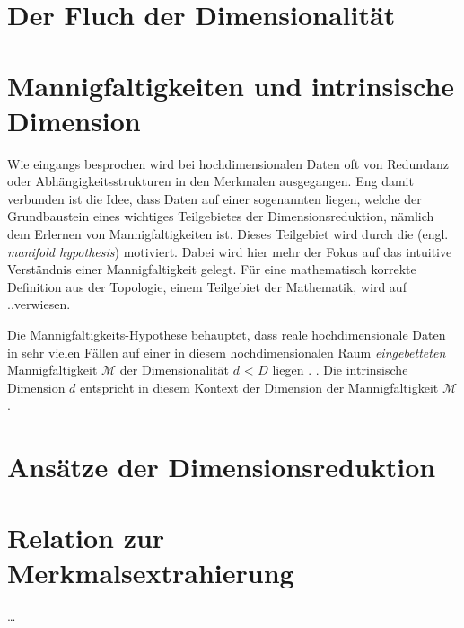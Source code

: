 \section{Der Fluch der Dimensionalität}
\label{ch:Dimensionsreduktion:FluchDerDim}

\section{Mannigfaltigkeiten und intrinsische Dimension}
\label{ch:Dimensionsreduktion:MannigfaltigkeitenIntrinsDim}

Wie eingangs besprochen wird bei hochdimensionalen Daten oft von Redundanz oder
Abhängigkeitsstrukturen in den Merkmalen ausgegangen. Eng damit verbunden ist die Idee, dass Daten
auf einer sogenannten  liegen, welche der Grundbaustein eines wichtiges
Teilgebietes der Dimensionsreduktion, nämlich dem Erlernen von Mannigfaltigkeiten \parencite{Cayton.2005} ist. Dieses Teilgebiet wird durch die 
(engl. \textit{manifold hypothesis}) motiviert. Dabei wird hier mehr der Fokus auf das intuitive
Verständnis einer Mannigfaltigkeit gelegt. Für eine mathematisch korrekte Definition aus der
Topologie, einem Teilgebiet der Mathematik, wird auf ..\addref verwiesen.

Die Mannigfaltigkeits-Hypothese behauptet, dass reale hochdimensionale Daten in sehr vielen Fällen
auf einer in diesem hochdimensionalen Raum \textit{eingebetteten} Mannigfaltigkeit $\mathcal{M}$
der Dimensionalität $d$ < $D$ liegen \parencite[vgl.][1]{Cayton.2005}. . Die
intrinsische Dimension $d$ entspricht in diesem Kontext der Dimension der Mannigfaltigkeit
$\mathcal{M}$.

\section{Ansätze der Dimensionsreduktion}
\label{ch:Dimensionsreduktion:Ansaetze}

\section{Relation zur Merkmalsextrahierung}
\label{ch:Dimensionsreduktion:Merkmalsextrahierung}

\ldots

